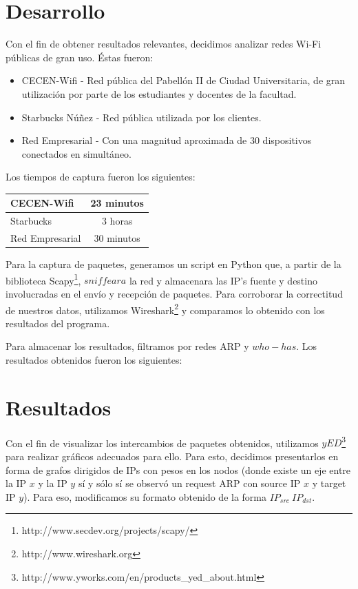 \documentclass[10pt, a4paper]{article}
\begin{document}
\section{Desarrollo}

Con el fin de obtener resultados relevantes, decidimos analizar redes Wi-Fi públicas de gran uso. Éstas fueron:

\begin{itemize}
\item CECEN-Wifi - Red pública del Pabellón II de Ciudad Universitaria, de gran utilización por parte de los estudiantes y docentes de la facultad.
\item Starbucks Núñez - Red pública utilizada por los clientes.
\item Red Empresarial - Con una magnitud aproximada de 30 dispositivos conectados en simultáneo.
\end{itemize}

Los tiempos de captura fueron los siguientes:

\begin{center}
  \begin{tabular}{| l | c |}
    \hline
    CECEN-Wifi & 23 minutos\\ \hline
    Starbucks & 3 horas\\ \hline
    Red Empresarial & 30 minutos\\
    \hline
  \end{tabular}
\end{center}

Para la captura de paquetes, generamos un script en Python que, a partir de la biblioteca Scapy\footnote{http://www.secdev.org/projects/scapy/}, $sniffeara$ la red y almacenara las IP's fuente y destino involucradas en el envío y recepción de paquetes. Para corroborar la correctitud de nuestros datos, utilizamos Wireshark\footnote{http://www.wireshark.org} y comparamos lo obtenido con los resultados del programa. 

Para almacenar los resultados, filtramos por redes ARP y $who-has$. Los resultados obtenidos fueron los siguientes:

\section{Resultados}
Con el fin de visualizar los intercambios de paquetes obtenidos, utilizamos $yED$\footnote{http://www.yworks.com/en/products\_yed\_about.html} para realizar gráficos adecuados para ello. Para esto, decidimos presentarlos en forma de grafos dirigidos de IPs con pesos en los nodos (donde existe un eje entre la IP $x$ y la IP $y$ sí y sólo sí se observó un request ARP con source IP $x$ y target IP $y$). Para eso, modificamos su formato obtenido de la forma $IP_{src}\ IP_{dst}$.
\end{document}
